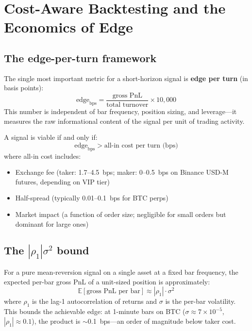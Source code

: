 \documentclass[11pt,a4paper]{article}
\begin{document}
\section{Cost-Aware Backtesting and the Economics of Edge}

\subsection{The edge-per-turn framework}

The single most important metric for a short-horizon signal is
\textbf{edge per turn} (in basis points):
\begin{equation}
  \text{edge}_{\text{bps}} = \frac{\text{gross PnL}}{\text{total turnover}}
  \times 10{,}000
\end{equation}
This number is independent of bar frequency, position sizing, and
leverage---it measures the raw informational content of the signal per
unit of trading activity.

A signal is viable if and only if:
\begin{equation}
  \text{edge}_{\text{bps}} > \text{all-in cost per turn (bps)}
\end{equation}
where all-in cost includes:
\begin{itemize}[leftmargin=1.5em]
  \item Exchange fee (taker: 1.7--4.5~bps; maker: 0--0.5~bps on
        Binance USD-M futures, depending on VIP tier)
  \item Half-spread (typically 0.01--0.1~bps for BTC perps)
  \item Market impact (a function of order size; negligible for small
        orders but dominant for large ones)
\end{itemize}

\subsection{The $|\rho_1|\sigma^2$ bound}

For a pure mean-reversion signal on a single asset at a fixed bar
frequency, the expected per-bar gross PnL of a unit-sized position is
approximately:
\begin{equation}
  \mathbb{E}[\text{gross PnL per bar}]
  \approx |\rho_1| \cdot \sigma^2
\end{equation}
where $\rho_1$ is the lag-1 autocorrelation of returns and $\sigma$ is
the per-bar volatility. This bounds the achievable edge: at 1-minute
bars on BTC ($\sigma \approx 7 \times 10^{-5}$, $|\rho_1| \approx 0.1$),
the product is $\sim$0.1~bps---an order of magnitude below taker cost.
\end{document}
